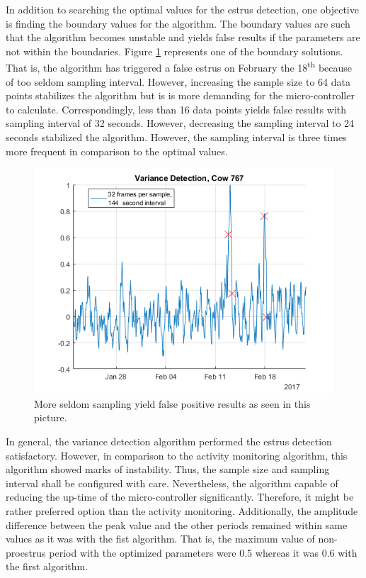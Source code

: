 \documentclass[english,12pt,a4paper,pdftex,elec,utf8]{aaltothesis}
\begin{document}
In addition to searching the optimal values for the estrus detection, one objective is finding the boundary values for the algorithm. The boundary values are such that the algorithm becomes unstable and yields false results if the parameters are not within the boundaries. Figure \ref{VarianceDetectionCow767_32frames144seconds} represents one of the boundary solutions. That is, the algorithm has triggered a false estrus on February the 18\textsuperscript{th} because of too seldom sampling interval. However, increasing the sample size to 64 data points stabilizes the algorithm but is is more demanding for the micro-controller to calculate. Correspondingly, less than 16 data points yields false results with sampling interval of 32 seconds. However, decreasing the sampling interval to 24 seconds stabilized the algorithm. However, the sampling interval is three times more frequent in comparison to the optimal values.


\begin{figure}[htb]
\centering
\includegraphics[width = 0.75 \textwidth]{figures/VarianceDetectionCow767_32frames144seconds.png}
\caption{More seldom sampling yield false positive results as seen in this picture.}
\label{VarianceDetectionCow767_32frames144seconds}
\end{figure}

In general, the variance detection algorithm performed the estrus detection satisfactory. However, in comparison to the activity monitoring algorithm, this algorithm showed marks of instability. Thus, the sample size and sampling interval shall be configured with care. Nevertheless, the algorithm capable of reducing the up-time of the micro-controller significantly. Therefore, it might be rather preferred option than the activity monitoring. Additionally, the amplitude difference between the peak value and the other periods remained within same values as it was with the fist algorithm. That is, the maximum value of non-proestrus period with the optimized parameters were 0.5 whereas it was 0.6 with the first algorithm.
\end{document}
